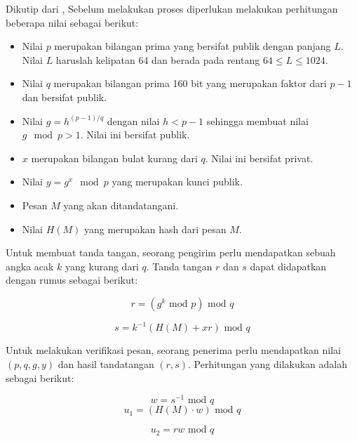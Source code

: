 \documentclass[10pt,conference]{IEEEtran}
\theoremstyle{definition}
\begin{document}
Dikutip dari \cite{b1}, Sebelum melakukan proses diperlukan melakukan perhitungan beberapa nilai sebagai berikut: 
\begin{itemize}
    \item Nilai $p$ merupakan bilangan prima yang bersifat publik dengan panjang $L$.  Nilai $L$ haruslah kelipatan 64 dan berada pada rentang $64 \le L \le 1024$. 
    \item Nilai $q$ merupakan bilangan prima 160 bit yang merupakan faktor dari $p - 1$ dan bersifat publik.
    \item Nilai $g = h ^ {(p-1)/q}$ dengan nilai $h < p - 1$ sehingga membuat nilai $g \mod p > 1$. Nilai ini bersifat publik.
    \item $x$ merupakan bilangan bulat kurang dari $q$.  Nilai ini bersifat privat.
    \item Nilai $y = g^x \mod p$ yang merupakan kunci publik.
    \item Pesan $M$ yang akan ditandatangani.
    \item Nilai $H(M)$ yang merupakan hash dari pesan $M$.
\end{itemize}

Untuk membuat tanda tangan, seorang pengirim perlu mendapatkan sebuah angka acak $k$ yang kurang dari $q$. Tanda tangan $r$ dan $s$ dapat didapatkan dengan rumus sebagai berikut: \cite{b1}

\begin{equation} \label{eq:dsa1} 
    r = (g^k \text{ mod } p) \text{ mod } q
\end{equation}

\begin{equation} \label{eq:dsa2} 
    s = k^{-1}(H(M) + xr) \text{ mod } q
\end{equation}

Untuk melakukan verifikasi pesan, seorang penerima perlu mendapatkan nilai $(p,q,g,y)$ dan hasil tandatangan $(r,s)$. Perhitungan yang dilakukan adalah sebagai berikut: \cite{b1}

\begin{equation} \label{eq:dsa3} 
    w = s^{-1} \text{ mod } q
\end{equation}
\begin{equation} \label{eq:dsa4} 
    u_1 = (H(M) \cdot w) \text{ mod } q
\end{equation}

\begin{equation} \label{eq:dsa5} 
    u_2 = rw \text{ mod } q
\end{equation}
\end{document}

